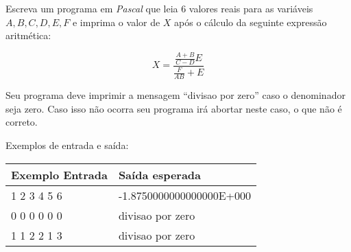 
\item Escreva um programa em \emph{Pascal} que leia
6 valores reais para as variáveis $A, B, C, D, E, F$ e
imprima o valor de $X$ após o cálculo
 da seguinte expressão aritmética:

     \[ X = \frac{\frac{A + B}{C - D}E}{\frac{F}{AB} + E} \]

Seu programa deve imprimir a mensagem ``divisao por zero''
caso o denominador seja zero. Caso isso não ocorra seu programa
irá abortar neste caso, o que não é correto.

Exemplos de entrada e saída:

\begin{center}
\begin{tabular}{|l|l|} \hline
Exemplo Entrada & Saída esperada \\ \hline
1 2 3 4 5 6     & -1.8750000000000000E+000  \\ \hline
0 0 0 0 0 0     & divisao por zero   \\ \hline
1 1 2 2 1 3     & divisao por zero   \\ \hline
\end{tabular}
\end{center}